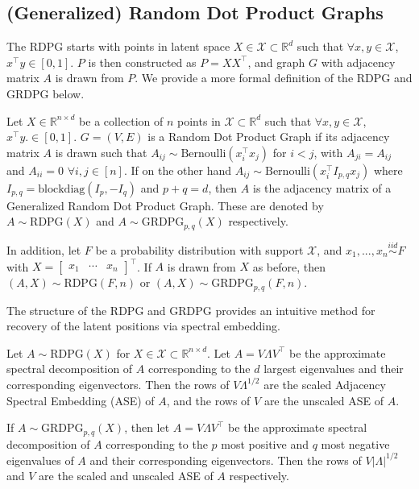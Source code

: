 \documentclass[
  11pt,
]{article}
\begin{document}
\hypertarget{generalized-random-dot-product-graphs}{%
\subsection{(Generalized) Random Dot Product
Graphs}\label{generalized-random-dot-product-graphs}}

The RDPG starts with points in latent space
\(X \in \mathcal{X} \subset \mathbb{R}^d\) such that
\(\forall x, y \in \mathcal{X}\), \(x^\top y \in [0, 1]\). \(P\) is then
constructed as \(P = X X^\top\), and graph \(G\) with adjacency matrix
\(A\) is drawn from \(P\). We provide a more formal definition of the
RDPG and GRDPG below.

\begin{definition}
Let $X \in \mathbb{R}^{n \times d}$ be a collection of $n$ points in $\mathcal{X} \subset \mathbb{R}^d$ such that $\forall x, y \in \mathcal{X}$, $x^\top y.\in [0, 1]$. $G = (V, E)$ is a Random Dot Product Graph if its adjacency matrix $A$ is drawn such that $A_{ij} \sim \text{Bernoulli}(x_i^\top x_j)$ for $i < j$, with $A_{ji} = A_{ij}$ and $A_{ii} = 0$ $\forall i, j \in [n]$. If on the other hand $A_{ij} \sim \text{Bernoulli}(x_i^\top I_{p, q} x_j)$ where $I_{p, q} = \text{blockdiag}(I_p, -I_q)$ and $p + q = d$, then $A$ is the adjacency matrix of a Generalized Random Dot Product Graph. These are denoted by $A \sim \text{RDPG}(X)$ and $A \sim \text{GRDPG}_{p, q}(X)$ respectively.

In addition, let $F$ be a probability distribution with support $\mathcal{X}$, and $x_1, ..., x_n \stackrel{iid}{\sim} F$ with $X = \begin{bmatrix} x_1 & \cdots & x_n \end{bmatrix}^\top$. If $A$ is drawn from $X$ as before, then $(A, X) \sim \text{RDPG}(F, n)$ or $(A, X) \sim \text{GRDPG}_{p, q}(F, n)$. 
\end{definition}

The structure of the RDPG and GRDPG provides an intuitive method for
recovery of the latent positions via spectral embedding.

\begin{definition}
Let $A \sim \text{RDPG}(X)$ for $X \in \mathcal{X} \subset \mathbb{R}^{n \times d}$. Let $A = V \Lambda V^\top$ be the approximate spectral decomposition of $A$ corresponding to the $d$ largest eigenvalues and their corresponding eigenvectors. Then the rows of $V \Lambda^{1/2}$ are the scaled Adjacency Spectral Embedding (ASE) of $A$, and the rows of $V$ are the unscaled ASE of $A$. 

If $A \sim \text{GRDPG}_{p, q}(X)$, then let $A = V \Lambda V^\top$ be the approximate spectral decomposition of $A$ corresponding to the $p$ most positive and $q$ most negative eigenvalues of $A$ and their corresponding eigenvectors. Then the rows of $V |\Lambda|^{1/2}$ and $V$ are the scaled and unscaled ASE of $A$ respectively.
\end{definition}
\end{document}
